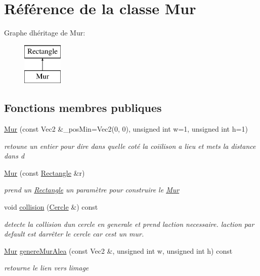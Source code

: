 \hypertarget{class_mur}{}\section{Référence de la classe Mur}
\label{class_mur}
Graphe d\textquotesingle{}héritage de Mur\+:\begin{figure}[H]
\begin{center}
\leavevmode
\includegraphics[height=2.000000cm]{class_mur}
\end{center}
\end{figure}
\subsection*{Fonctions membres publiques}
\begin{DoxyCompactItemize}
\item 
\mbox{\hyperlink{class_mur_a52a18f3a0baad70fb413f39e3d29c5a3}{Mur}} (const Vec2 \&\+\_\+pos\+Min=Vec2(0, 0), unsigned int w=1, unsigned int h=1)
\begin{DoxyCompactList}\small\item\em retoune un entier pour dire dans quelle coté la coiilison a lieu et mets la distance dans d \end{DoxyCompactList}\item 
\mbox{\label{class_mur_ac17cde341fa126c26a24128d094557a4}} 
\mbox{\hyperlink{class_mur_ac17cde341fa126c26a24128d094557a4}{Mur}} (const \mbox{\hyperlink{class_rectangle}{Rectangle}} \&r)
\begin{DoxyCompactList}\small\item\em prend un \mbox{\hyperlink{class_rectangle}{Rectangle}} un paramètre pour construire le \mbox{\hyperlink{class_mur}{Mur}} \end{DoxyCompactList}\item 
void \mbox{\hyperlink{class_mur_a63a7560c521670716cd90c3599abcd71}{collision}} (\mbox{\hyperlink{class_cercle}{Cercle}} \&) const
\begin{DoxyCompactList}\small\item\em detecte la collision d\textquotesingle{}un cercle en generale et prend l\textquotesingle{}action necessaire. l\textquotesingle{}action par default est d\textquotesingle{}arrêter le cercle car c\textquotesingle{}est un mur. \end{DoxyCompactList}\item 
\mbox{\hyperlink{class_mur}{Mur}} \mbox{\hyperlink{class_mur_aeb65d73f7f7176a5e77e220107a4902f}{genere\+Mur\+Alea}} (const Vec2 \&, unsigned int w, unsigned int h) const
\begin{DoxyCompactList}\small\item\em retourne le lien vers l\textquotesingle{}image \end{DoxyCompactList}\end{DoxyCompactItemize}

